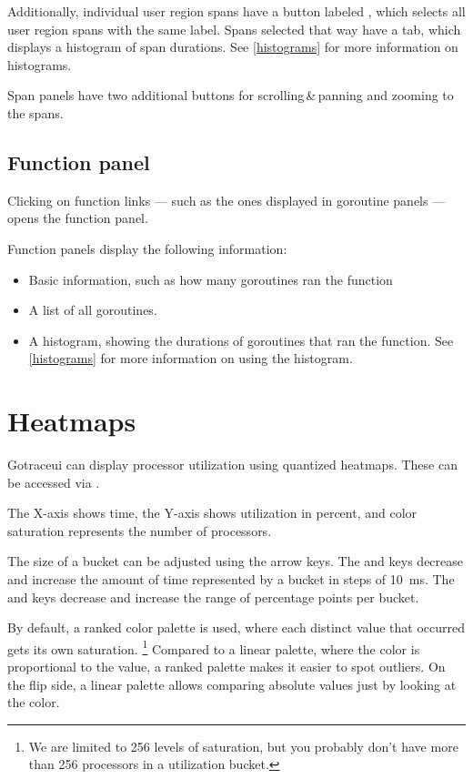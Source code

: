 \documentclass[10pt,letterpaper,oneside,openany,english]{memoir}
\begin{document}
Additionally, individual user region spans have a button labeled ,
which selects all user region spans with the same label.
Spans selected that way have a  tab, which displays a histogram of span durations.
See \cref{histograms} for more information on histograms.

Span panels have two additional buttons for scrolling\,\&\,panning and zooming to the spans.

\subsection{Function panel}\label{function-panel}

Clicking on function links --- such as the ones displayed in goroutine panels --- opens the function panel.

Function panels display the following information:

\begin{itemize}
\item Basic information, such as how many goroutines ran the function
\item A list of all goroutines.
\item A histogram, showing the durations of goroutines that ran the function.
  See \cref{histograms} for more information on using the histogram.
\end{itemize}

\section{Heatmaps}

Gotraceui can display processor utilization using quantized heatmaps.
These can be accessed via .

The X-axis shows time, the Y-axis shows utilization in percent, and color saturation represents the number of processors.

The size of a bucket can be adjusted using the arrow keys. The \keys{\arrowkey{<}} and \keys{\arrowkey{>}} keys decrease and increase the amount of time represented by a bucket in steps of \qty{10}{\milli\second}.
The  and \keys{\arrowkey{^}} keys decrease and increase the range of percentage points per bucket.

By default, a ranked color palette is used, where each distinct value that occurred gets its own saturation.%
\footnote{We are limited to 256 levels of saturation, but you probably don't have more than 256 processors in a utilization bucket.}
Compared to a linear palette, where the color is proportional to the value, a ranked palette makes it easier to spot outliers.
On the flip side, a linear palette allows comparing absolute values just by looking at the color.
\end{document}
